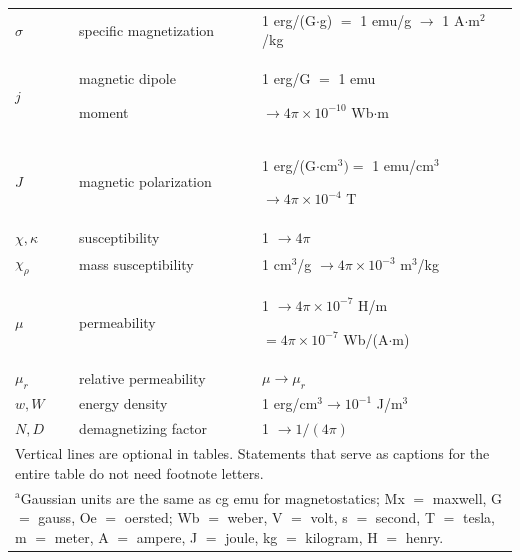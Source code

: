 \documentclass[journal,twoside,web]{ieeecolor}
\begin{document}
\begin{table}
\begin{tabular}{|p{25pt}|p{75pt}|p{115pt}|}
        $\sigma $                                      &
        specific magnetization                         &
        1 erg/(G$\cdot $g) $=$ 1 emu/g $\to $ 1 A$\cdot $m$^{2}$/kg                     \\
        $j$                                            &
        magnetic dipole \par moment                    &
        1 erg/G $=$ 1 emu \par $\to 4\pi \times  10^{-10}$ Wb$\cdot $m                  \\
        $J$                                            &
        magnetic polarization                          &
        1 erg/(G$\cdot $cm$^{3}) =$ 1 emu/cm$^{3}$ \par $\to 4\pi \times  10^{-4}$ T    \\
        $\chi , \kappa $                               &
        susceptibility                                 &
        1 $\to  4\pi $                                                                  \\
        $\chi_{\rho }$                                 &
        mass susceptibility                            &
        1 cm$^{3}$/g $\to  4\pi \times  10^{-3}$ m$^{3}$/kg                             \\
        $\mu $                                         &
        permeability                                   &
        1 $\to  4\pi \times  10^{-7}$ H/m \par $= 4\pi \times  10^{-7}$ Wb/(A$\cdot $m) \\
        $\mu_{r}$                                      &
        relative permeability                          &
        $\mu \to \mu_{r}$                                                               \\
        $w, W$                                         &
        energy density                                 &
        1 erg/cm$^{3} \to  10^{-1}$ J/m$^{3}$                                           \\
        $N, D$                                         &
        demagnetizing factor                           &
        1 $\to  1/(4\pi )$                                                              \\
        \hline
        \multicolumn{3}{p{251pt}}{Vertical lines are optional in tables. Statements that serve as captions for
        the entire table do not need footnote letters. }                                \\
        \multicolumn{3}{p{251pt}}{$^{\mathrm{a}}$Gaussian units are the same as cg emu for magnetostatics; Mx
            $=$ maxwell, G $=$ gauss, Oe $=$ oersted; Wb $=$ weber, V $=$ volt, s $=$
            second, T $=$ tesla, m $=$ meter, A $=$ ampere, J $=$ joule, kg $=$
            kilogram, H $=$ henry.}
    \end{tabular}
    \label{tab1}
\end{table}
\end{document}
